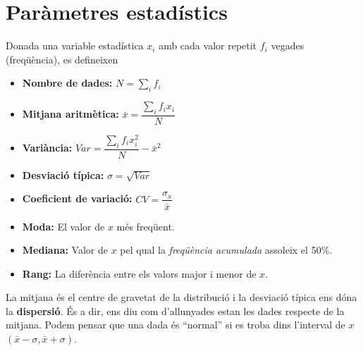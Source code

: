 \section{Paràmetres estadístics}
\begin{theorybox}
	Donada una variable estadística $x_i$ amb cada valor repetit $f_i$ vegades (freqüència), es defineixen	
	
	\begin{minipage}{0.45\textwidth}
	\begin{itemize}
		\item \textbf{Nombre de dades:} $N=\sum_i f_i$
		\item \textbf{Mitjana aritmètica:} $\bar x=\dfrac{\sum_i f_i x_i}{N}$
		\item \textbf{Variància:} $Var=\dfrac{\sum_i f_i x^2_i}{N}-\bar x^2$
		\item \textbf{Desviació típica:} $\sigma=\sqrt{Var}$		
		\item \textbf{Coeficient de variació:} $CV = \dfrac{\sigma_x}{\bar x}$
	\end{itemize}
	\end{minipage}
	\hspace{0.3cm}
	\begin{minipage}{0.44\textwidth}
				\begin{itemize}
				\item \textbf{Moda:} El valor de $x$ més freqüent.
				\item \textbf{Mediana:} Valor de $x$ pel qual la {\normalfont \textit{freqüència acumulada}} assoleix el 50\%.
				\item \textbf{Rang:} La diferència entre els valors major i menor de $x$.
				 
			\end{itemize}
	\end{minipage}
	
	La mitjana és el centre de gravetat de la distribució i la desviació típica ens dóna la \textbf{dispersió}. És a dir, ens diu com d'allunyades estan les dades respecte de la mitjana. 
	Podem pensar que una dada és ``normal'' si es troba dins l'interval de $x$ $(\bar x -\sigma, \bar x + \sigma)$.
\end{theorybox}
	
